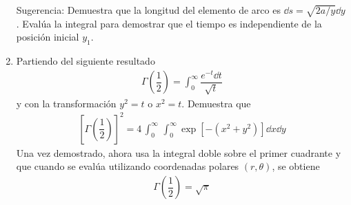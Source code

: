 \begin{enumerate}
Sugerencia: Demuestra que la longitud del elemento de arco es $\dd{s} = \sqrt{2a/y} \dd{y}$. Evalúa la integral para demostrar que el tiempo es independiente de la posición inicial $y_{1}$.
\item Partiendo del siguiente resultado
\begin{align*}
\Gamma \left( \dfrac{1}{2} \right) = \int_{0}^{\infty} \dfrac{e^{-t} \dd{t}}{\sqrt{t}}
\end{align*}
y con la transformación $y^{2} = t$ o $x^{2}=t$. Demuestra que
\begin{align*}
\left[ \Gamma \left( \dfrac{1}{2} \right) \right]^{2} = 4 \,  \int_{0}^{\infty} \, \int_{0}^{\infty} \exp[-(x^{2} + y^{2})] \dd{x} \dd{y}
\end{align*}
Una vez demostrado, ahora usa la integral doble sobre el primer cuadrante y que cuando se evalúa utilizando coordenadas polares $(r, \theta)$, se obtiene
\begin{align*}
\Gamma \left( \dfrac{1}{2} \right) = \sqrt{\pi}
\end{align*}
\end{enumerate}
